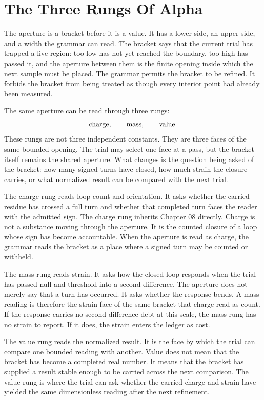 \section{The Three Rungs Of Alpha}

The aperture is a bracket before it is a value. It has a lower side, an upper
side, and a width the grammar can read. The bracket says that the current
trial has trapped a live region: too low has not yet reached the boundary,
too high has passed it, and the aperture between them is the finite opening
inside which the next sample must be placed. The grammar permits the bracket
to be refined. It forbids the bracket from being treated as though every
interior point had already been measured.

The same aperture can be read through three rungs:
\[
  \hbox{charge},\qquad \hbox{mass},\qquad \hbox{value}.
\]
These rungs are not three independent constants. They are three faces of the
same bounded opening. The trial may select one face at a pass, but the bracket
itself remains the shared aperture. What changes is the question being asked
of the bracket: how many signed turns have closed, how much strain the
closure carries, or what normalized result can be compared with the next
trial.

The charge rung reads loop count and orientation. It asks whether the carried
residue has crossed a full turn and whether that completed turn faces the
reader with the admitted sign. The charge rung inherits Chapter 08 directly.
Charge is not a substance moving through the aperture. It is the counted
closure of a loop whose sign has become accountable. When the aperture is
read as charge, the grammar reads the bracket as a place where a signed
turn may be counted or withheld.

The mass rung reads strain. It asks how the closed loop responds when the
trial has passed null and threshold into a second difference. The aperture
does not merely say that a turn has occurred. It asks whether the response
bends. A mass reading is therefore the strain face of the same bracket that
charge read as count. If the response carries no second-difference debt at
this scale, the mass rung has no strain to report. If it does, the strain
enters the ledger as cost.

The value rung reads the normalized result. It is the face by which the
trial can compare one bounded reading with another. Value does not mean that
the bracket has become a completed real number. It means that the bracket
has supplied a result stable enough to be carried across the next comparison.
The value rung is where the trial can ask whether the carried charge and
strain have yielded the same dimensionless reading after the next refinement.

